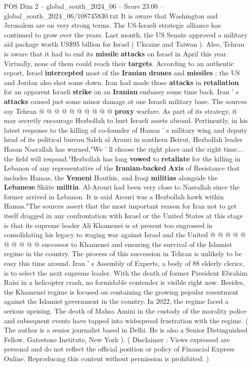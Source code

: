 \begin{textsample}{POS Dim 2 – global\_south\_2024\_06 – Score 23.00 – global\_south\_2024\_06/108745830.txt}
It is aware that Washington and Jerusalem are on very strong terms.
The US-Israeli strategic alliance has continued to grow over the years.
Last month, the US Senate approved a military aid package worth US\$95 billion for Israel ( Ukraine and Taiwan ).
Also, Tehran is aware that it had to end its \textbf{missile} \textbf{attacks} on Israel in April this year.
Virtually, none of them could reach their \textbf{targets}.
According to an authentic report, Israel \textbf{intercepted} most of the \textbf{Iranian} \textbf{drones} and \textbf{missiles} ; the US and Jordan also shot some down.
Iran had made those \textbf{attacks} in \textbf{retaliation} for an apparent Israeli \textbf{strike} on an \textbf{Iranian} embassy some time back.
Iran ' s \textbf{attacks} caused just some minor damage at one Israeli military base.
The sources say Tehran @ @ @ @ @ @ @ @ @ @ \textbf{proxy} warfare.
As part of its strategy, it may secretly encourage Hezbollah to hurt Israeli assets abroad.
Pertinently, in his latest response to the killing of co-founder of Hamas ' s military wing and deputy head of its political bureau Saleh al Arouri in southern Beirut, Hezbollah leader Hasan Nasrallah has warned,"We ' ll choose the right place and the right time... the field will respond."Hezbollah has long \textbf{vowed} to \textbf{retaliate} for the killing in Lebanon of any representative of the \textbf{Iranian-backed} \textbf{Axis} of Resistance that includes Hamas, the \textbf{Yemeni} Houthis, and Iraqi \textbf{militias} alongside the \textbf{Lebanese} Shiite \textbf{militia}.
Al-Arouri had been very close to Nasrallah since the former arrived in Lebanon.
It is said Arouri was a Hezbollah hawk within Hamas."The sources assert that the most important reason for Iran not to get itself dragged in any confrontation with Israel or the United States at this stage is that its supreme leader Ali Khamenei is at present too engrossed in consolidating his legacy to waging war against Israel and the United @ @ @ @ @ @ @ @ @ @ successor to Khamenei and ensuring the survival of the Islamist regime in the country.
The process of this succession in Tehran is unlikely to be easy this time around.
Iran ' s Assembly of Experts, a body of 88 elderly clerics, is to select the next supreme leader.
With the death of former President Ebrahim Raisi in a helicopter crash, no formidable contender is visible right now.
Besides, the Khamenei regime is focused on containing the growing popular resentment against the Islamist government in the country.
In 2022, the regime faced a serious uprising.
The death of Mahsa Amini in the custody of the morality police and subsequent events have tapped into widespread frustration with the regime. ( The author is a senior journalist based in Delhi.
He is also a Senior Distinguished Fellow, Gatestone Institute, New York ). ( Disclaimer : Views expressed are personal and do not reflect the official position or policy of Financial Express Online.
Reproducing this content without permission is prohibited. )


\end{textsample}
